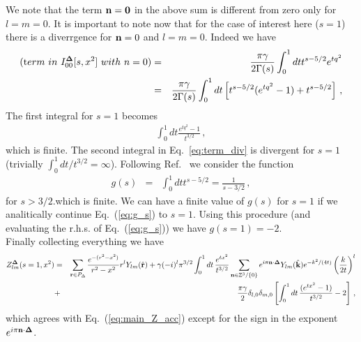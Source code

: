 	We note that the term ${\bf n}={\bf 0}$ in the above sum is different from zero only for $l=m=0$.
	It is important to note now that for the case of interest here ($s=1$) there is a diverrgence for ${\bf n}=0$ and $l=m=0$.
	Indeed we have
	\begin{eqnarray}
	({\mbox term\,\, in\,\,}I^{\bf\Delta}_{00}[s,x^2] {\mbox \,\,with\,\,n=0 })&=&\frac{\pi\gamma}{2\Gamma(s)}\int_0^1dt t^{s-5/2}e^{tq^2}\nonumber\\
	&=&\frac{\pi\gamma}{2\Gamma(s)}\int_0^1dt\left[t^{s-5/2}(e^{tq^2}-1)+t^{s-5/2}\right]\, ,\label{eq:term_div}
	\end{eqnarray} 
	The first integral for $s=1$ becomes
	\begin{eqnarray}
	\int_0^1dt\frac{e^{tq^2}-1}{t^{3/2}}\, ,
	\end{eqnarray}
	which is finite. The second integral in Eq.~\ref{eq:term_div} is divergent for $s=1$ (trivially 
	$\int_0^1dt/t^{3/2}=\infty$). Following Ref.~\cite{Leskovec:2012gb} we consider the function
	\begin{eqnarray}
	g(s)&=&\int_0^1dtt^{s-5/2}=\frac{1}{s-3/2}\, ,\label{eq:g_s}
	\end{eqnarray}
	for $s>3/2$.which is finite. We can have a finite value of $g(s)$ for $s=1$ if we analitically continue  Eq.~(\ref{eq:g_s}) to $s=1$. Using this procedure (and evaluating the r.h.s. of Eq.~(\ref{eq:g_s})) we have $g(s=1)=-2$.\\
	Finally collecting everything we have
	\begin{eqnarray}
	Z^{\bf\Delta}_{lm}(s=1,x^2)&=&\sum_{{\bf r}\in P_\Delta}\frac{e^{-(r^2-x^2)}}{r^2-x^2}r^lY_{lm}(\hat{{\bf r}})+\gamma(-i)^l\pi^{3/2}\int_0^1dt\,\frac{e^{tx^2}}{t^{3/2}}\sum_{{\bf n}\in\mathbb{Z}^3/\{0\}}e^{i\pi{\bf n}\cdot{\bf \Delta}}Y_{lm}(\hat{\bf k})e^{-k^2/(4t)}\left(\frac{k}{2t}\right)^l\nonumber\\
	&+&\frac{\pi\gamma}{2}\delta_{l,0}\delta_{m,0}\left[\int_0^1 dt\,\frac{(e^{tx^2}-1)}{t^{3/2}}-2\right]\, ,
	\end{eqnarray}
	which agrees with Eq.~(\ref{eq:main_Z_acc}) {\color{red}except for the sign in the exponent 
	$e^{i\pi{\bf n}\cdot{\bf \Delta}} $}.
	 

	
